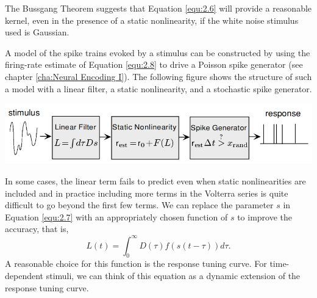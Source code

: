 \begin{rem}
  The Bussgang Theorem suggests that Equation \ref{equ:2.6} will provide a reasonable kernel, even in the presence of a static nonlinearity, if the white noise stimulus used is Gaussian.
\end{rem}

\begin{exm}
  A model of the spike trains evoked by a stimulus can be constructed by using the firing-rate estimate of Equation \ref{equ:2.8} to drive a Poisson spike generator (see chapter \ref{cha:Neural Encoding I}). The following figure shows the structure of such a model with a linear filter, a static nonlinearity, and a stochastic spike generator.
  \begin{center}
    \includegraphics[scale=0.3]{./png/nonlinearGenerator}
  \end{center}
\end{exm}


\begin{rem}
  In some cases, the linear term fails to predict even when static nonlinearities are included and in practice including more terms in the Volterra series is quite difficult to go beyond the first few terms. We can replace the parameter $s$ in Equation \ref{equ:2.7} with an appropriately chosen function of $s$ to improve the accuracy, that is,
  \begin{displaymath}
    \label{equ:2.12}
    L(t) = \int_0^{\infty}D(\tau)f(s(t-\tau))d\tau.
  \end{displaymath}
  A reasonable choice for this function is the response tuning curve.
  For time-dependent stimuli, we can think of this equation as a dynamic extension of the response tuning curve.
\end{rem}




 










